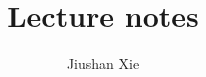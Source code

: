 \documentclass[aps,prx,twocolumn]{revtex4-2}
\begin{document}
\raggedbottom

\newcommand{\yg}[1]{\textcolor{olive}{#1}}
\newcommand{\tk}[1]{\textcolor{blue}{#1}}
\newcommand{\cyf}[1]{\textcolor{orange}{#1}}
\newcommand{\mansi}[1]{\textcolor{purple}{#1}}
\newcommand{\todo}[1]{\textcolor{red}{#1}}

\def\MB{\textcolor{brown}}


\title{Lecture notes}
\author{Jiushan Xie}
\maketitle
\end{document}

